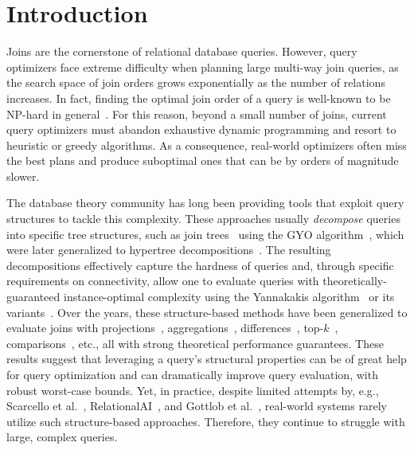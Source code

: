 \section{Introduction}
\label{sec:intro}

Joins are the cornerstone of relational database queries.  However, query optimizers face extreme difficulty when planning large multi-way join queries, as the search space of join orders grows exponentially as the number of relations increases.  In fact, finding the optimal join order of a query is well-known to be NP-hard in general~\cite{cluet_complexity_1995,scheufele_constructing_1996}. For this reason, beyond a small number of joins, current query optimizers must abandon exhaustive dynamic programming and resort to heuristic or greedy algorithms.  As a consequence, real-world optimizers often miss the best plans and produce suboptimal ones that can be by orders of magnitude slower.

The database theory community has long been providing tools that exploit query structures to tackle this complexity.  These approaches usually \emph{decompose} queries into specific tree structures, such as join trees~\cite{yannakakis_algorithms_1981} using the GYO algorithm~\cite{grahamGYO,DBLP:conf/compsac/YuO79}, which were later generalized to hypertree decompositions~\cite{DBLP:journals/jcss/GottlobLS02}. The resulting decompositions effectively capture the hardness of queries and, through specific requirements on connectivity, allow one to evaluate queries with theoretically-guaranteed instance-optimal complexity using the Yannakakis algorithm~\cite{bernstein_using_1981,yannakakis_algorithms_1981} or its variants~\cite{wang_yannakakis_2025,DBLP:journals/jcss/GottlobLS02}.
Over the years, these structure-based methods have been generalized to evaluate joins with projections~\cite{PODS251,PODS252,CDE}, aggregations~\cite{AJAR, FAQ}, differences~\cite{SIGMOD23, PODS24}, top-$k$~\cite{wang2023relational}, comparisons~\cite{SIGMOD22}, etc., all with strong theoretical performance guarantees.  These results suggest that leveraging a query’s structural properties can be of great help for query optimization and can dramatically improve query evaluation, with robust worst-case bounds. Yet, in practice, despite limited attempts by, e.g., Scarcello et al.~\cite{scarcello_weighted_2007}, RelationalAI~\cite{submodularwidth}, and Gottlob et al.~\cite{gottlob_reaching_2023}, real-world systems rarely utilize such structure-based approaches. Therefore, they continue to struggle with large, complex queries.


